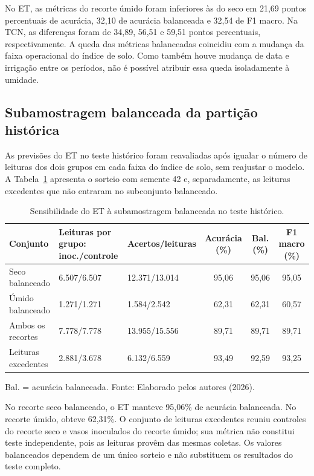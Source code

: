 No ET, as métricas do recorte úmido foram inferiores às do seco em 21,69
pontos percentuais de acurácia, 32,10 de acurácia balanceada e 32,54 de
F1 macro. Na TCN, as diferenças foram de 34,89, 56,51 e 59,51 pontos
percentuais, respectivamente. A queda das métricas balanceadas coincidiu
com a mudança da faixa operacional do índice de solo. Como também houve
mudança de data e irrigação entre os períodos, não é possível atribuir
essa queda isoladamente à umidade.

\subsection{Subamostragem balanceada da partição histórica}
\label{subsec:resultados_subamostragem_historica}

As previsões do ET no teste histórico foram reavaliadas após igualar o
número de leituras dos dois grupos em cada faixa do índice de solo,
sem reajustar o modelo. A Tabela~\ref{tab:subamostragem_historica}
apresenta o sorteio com semente 42 e, separadamente, as leituras
excedentes que não entraram no subconjunto balanceado.

\begin{table}[H]
    \centering
    \scriptsize
    \caption{Sensibilidade do ET à subamostragem balanceada no teste histórico.}
    \label{tab:subamostragem_historica}
    \begin{tabular}{p{}p{}p{}ccc}
        \hline
        Conjunto & Leituras por grupo: inoc./controle & Acertos/leituras & Acurácia (\%) & Bal. (\%) & F1 macro (\%) \\
        \hline
        Seco balanceado & 6.507/6.507 & 12.371/13.014 & 95,06 & 95,06 & 95,05 \\
        Úmido balanceado & 1.271/1.271 & 1.584/2.542 & 62,31 & 62,31 & 60,57 \\
        Ambos os recortes & 7.778/7.778 & 13.955/15.556 & 89,71 & 89,71 & 89,71 \\
        Leituras excedentes & 2.881/3.678 & 6.132/6.559 & 93,49 & 92,59 & 93,25 \\
        \hline
    \end{tabular}

    \vspace{0.1cm}
    {\footnotesize Bal. = acurácia balanceada. Fonte: Elaborado pelos autores (2026).}
\end{table}

No recorte seco balanceado, o ET manteve 95,06\% de acurácia
balanceada. No recorte úmido, obteve 62,31\%. O conjunto de leituras
excedentes reuniu controles do recorte seco e vasos inoculados do
recorte úmido; sua métrica não constitui teste independente, pois as
leituras provêm das mesmas coletas. Os valores balanceados dependem de
um único sorteio e não substituem os resultados do teste completo.

